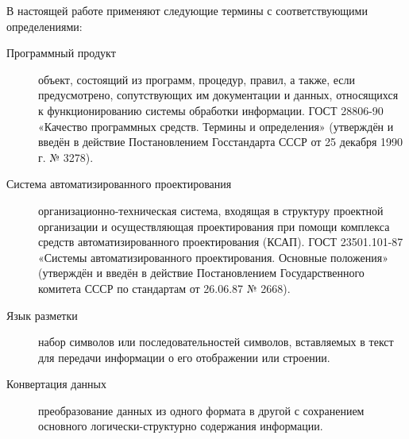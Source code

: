 \Defines %

В настоящей работе применяют следующие термины с соответствующими определениями:

\begin{description}

\item[Программный продукт] объект, состоящий из программ, процедур, правил, а также, если предусмотрено, сопутствующих им документации и данных, относящихся к функционированию системы обработки информации. ГОСТ 28806-90 «Качество программных средств. Термины и определения» (утверждён и введён в действие Постановлением Госстандарта СССР от 25 декабря 1990 г. № 3278).

\item[Система автоматизированного проектирования] организационно-техническая система, входящая в структуру проектной организации и осуществляющая проектирования при помощи комплекса средств автоматизированного проектирования (КСАП). ГОСТ 23501.101-87 «Системы автоматизированного проектирования. Основные положения» (утверждён и введён в действие Постановлением Государственного комитета СССР по стандартам от 26.06.87 № 2668).

\item[Язык разметки] набор символов или последовательностей символов, вставляемых в текст для передачи информации о его отображении или строении.

\item[Конвертация данных] преобразование данных из одного формата в другой с сохранением основного логически-структурно содержания информации.

\end{description}

